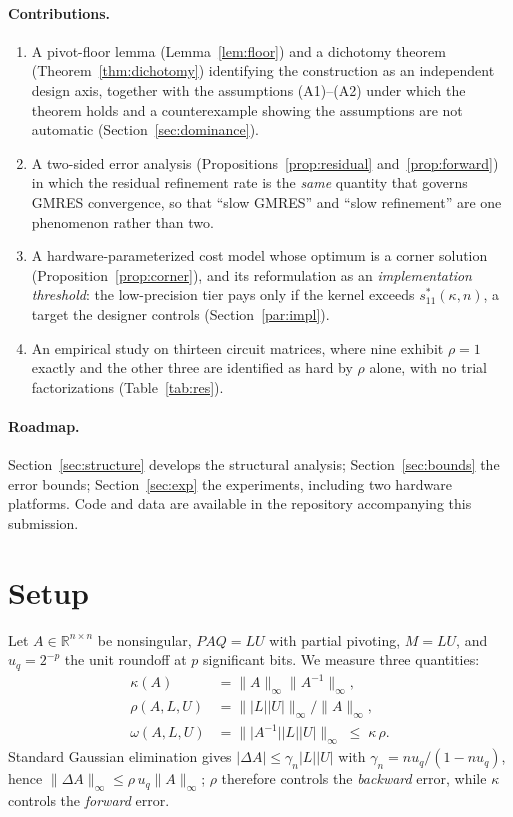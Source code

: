 \documentclass[11pt]{article}
\theoremstyle{remark}
\newcommand{\norm}[1]{\lVert #1 \rVert}
\newcommand{\abs}[1]{\lvert #1 \rvert}
\begin{document}
\paragraph{Contributions.}
\begin{enumerate}
  \item A pivot-floor lemma (Lemma~\ref{lem:floor}) and a dichotomy theorem
        (Theorem~\ref{thm:dichotomy}) identifying the construction as an
        independent design axis, together with the assumptions (A1)--(A2) under
        which the theorem holds and a counterexample showing the assumptions are
        not automatic (Section~\ref{sec:dominance}).
  \item A two-sided error analysis (Propositions~\ref{prop:residual}
        and~\ref{prop:forward}) in which the residual refinement rate is the
        \emph{same} quantity that governs GMRES convergence, so that ``slow
        GMRES'' and ``slow refinement'' are one phenomenon rather than two.
  \item A hardware-parameterized cost model whose optimum is a corner solution
        (Proposition~\ref{prop:corner}), and its reformulation as an
        \emph{implementation threshold}: the low-precision tier pays only if the
        kernel exceeds $s_{11}^*(\kappa,n)$, a target the designer controls
        (Section~\ref{par:impl}).
  \item An empirical study on thirteen circuit matrices, where nine exhibit
        $\rho=1$ exactly and the other three are identified as hard by $\rho$
        alone, with no trial factorizations (Table~\ref{tab:res}).
\end{enumerate}

\paragraph{Roadmap.}
Section~\ref{sec:structure} develops the structural analysis;
Section~\ref{sec:bounds} the error bounds; Section~\ref{sec:exp} the experiments,
including two hardware platforms. Code and data are available in the repository
accompanying this submission.

\section{Setup}

Let $A\in\mathbb{R}^{n\times n}$ be nonsingular, $PAQ=LU$ with partial pivoting,
$M=L U$, and $u_q=2^{-p}$ the unit roundoff at $p$ significant bits. We measure
three quantities:
\begin{align}
  \kappa(A) &= \norm{A}_\infty \norm{A^{-1}}_\infty, \\
  \rho(A,L,U) &= \norm{\abs{L}\abs{U}}_\infty / \norm{A}_\infty, \\
  \omega(A,L,U) &= \norm{\abs{A^{-1}}\abs{L}\abs{U}}_\infty \;\le\; \kappa\,\rho .
\end{align}
Standard Gaussian elimination gives $\abs{\Delta A}\le\gamma_n\abs{L}\abs{U}$ with
$\gamma_n=nu_q/(1-nu_q)$, hence $\norm{\Delta A}_\infty\le \rho\,u_q\norm{A}_\infty$;
$\rho$ therefore controls the \emph{backward} error, while $\kappa$ controls the
\emph{forward} error.
\end{document}
